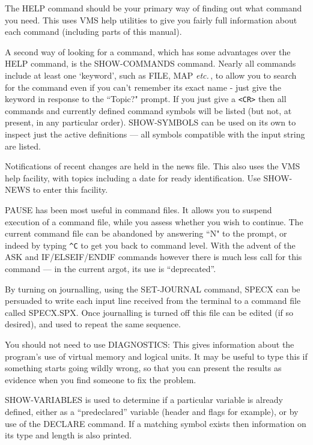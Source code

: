 \documentclass[11pt,twoside]{report}
\newcommand{\etc}{{\it etc.\,}}
\begin{document}
The HELP command should be your primary way of finding out what command you
need. This uses VMS help utilities to give you fairly full information
about each command (including parts of this manual).

A second way of looking for a command, which has some advantages over the HELP
command, is the SHOW-COMMANDS command. Nearly all commands include at least
one `keyword', such as FILE, MAP \etc, to allow you to search
for the command even if you can't remember its exact name - just give the
keyword in response to the ``Topic?" prompt. If you just give a \verb+<CR>+
then all commands and currently defined command symbols will be listed (but
not, at present, in any particular order). SHOW-SYMBOLS can be used on its
own to inspect just the active definitions --- all symbols compatible with
the input string are listed.

Notifications of recent changes are held in the news file. This
also uses the VMS help facility, with topics including a date
for ready identification. Use SHOW-NEWS to enter this facility. 

PAUSE has been most useful in command files. It allows you to suspend execution
of a command file, while you assess whether you wish to continue. The current
command file can be abandoned by answering ``N" to the prompt, or indeed by
typing \verb+^C+ to get you back to command level. With the advent of the ASK
and IF/ELSEIF/ENDIF commands however there is much less call for this command
--- in the current argot, its use is ``deprecated''. 

By turning on journalling, using the SET-JOURNAL command,
SPECX can be persuaded to write each input line received from the terminal
to a command file called SPECX.SPX. Once journalling is turned off this file
can be edited (if so desired), and used to repeat the same sequence.

You should not need to use DIAGNOSTICS: This gives information about the
program's use of virtual memory and logical units. It may be useful to type
this if something starts going wildly wrong, so that you can present the
results as evidence when you find someone to fix the problem.

SHOW-VARIABLES is used to determine if a particular variable is already
defined, either as a ``predeclared'' variable (header and flags for example),
or by use of the DECLARE command. If a matching symbol exists then information
on its type and length is also printed.
\end{document}
